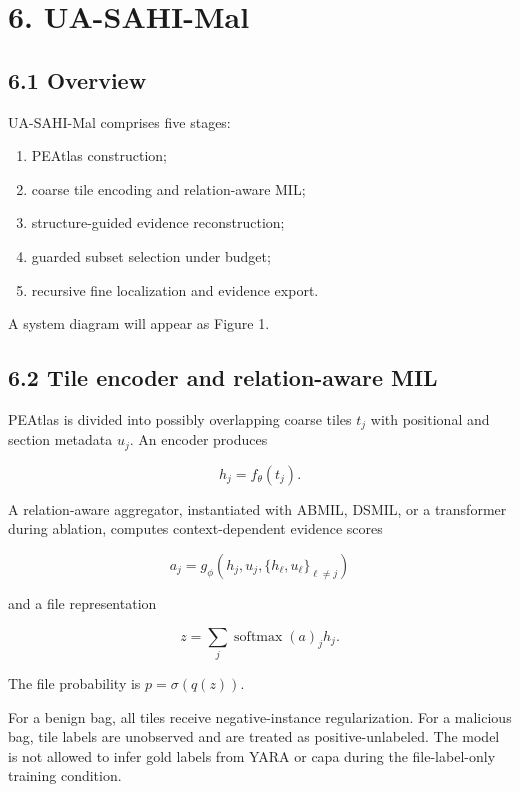 \documentclass[
  10pt,
]{article}
\providecommand{\tightlist}{%
  \setlength{\itemsep}{0pt}\setlength{\parskip}{0pt}}
\begin{document}
\section{6. UA-SAHI-Mal}\label{ua-sahi-mal}

\subsection{6.1 Overview}\label{overview}

UA-SAHI-Mal comprises five stages:

\begin{enumerate}
\def\labelenumi{\arabic{enumi}.}
\tightlist
\item
  PEAtlas construction;
\item
  coarse tile encoding and relation-aware MIL;
\item
  structure-guided evidence reconstruction;
\item
  guarded subset selection under budget;
\item
  recursive fine localization and evidence export.
\end{enumerate}

A system diagram will appear as Figure 1.

\subsection{6.2 Tile encoder and relation-aware
MIL}\label{tile-encoder-and-relation-aware-mil}

PEAtlas is divided into possibly overlapping coarse tiles \(t_j\) with
positional and section metadata \(u_j\). An encoder produces

\[
h_j = f_\theta(t_j).
\]

A relation-aware aggregator, instantiated with ABMIL, DSMIL, or a
transformer during ablation, computes context-dependent evidence scores

\[
a_j = g_\phi(h_j, u_j, \{h_\ell,u_\ell\}_{\ell \ne j})
\]

and a file representation

\[
z = \sum_j \operatorname{softmax}(a)_j h_j.
\]

The file probability is \(p=\sigma(q(z))\).

For a benign bag, all tiles receive negative-instance regularization.
For a malicious bag, tile labels are unobserved and are treated as
positive-unlabeled. The model is not allowed to infer gold labels from
YARA or capa during the file-label-only training condition.
\end{document}
